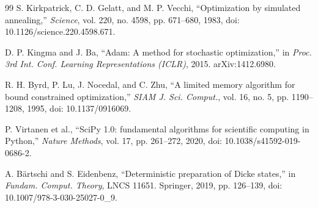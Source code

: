 \documentclass{ieeeaccess}
\begin{document}
\begin{thebibliography}{99}
 S. Kirkpatrick, C. D. Gelatt, and M. P. Vecchi, ``Optimization by simulated annealing,'' \textit{Science}, vol. 220, no. 4598, pp. 671--680, 1983, doi: 10.1126/science.220.4598.671.

 D. P. Kingma and J. Ba, ``Adam: A method for stochastic optimization,'' in \textit{Proc. 3rd Int. Conf. Learning Representations (ICLR)}, 2015. arXiv:1412.6980.

 R. H. Byrd, P. Lu, J. Nocedal, and C. Zhu, ``A limited memory algorithm for bound constrained optimization,'' \textit{SIAM J. Sci. Comput.}, vol. 16, no. 5, pp. 1190--1208, 1995, doi: 10.1137/0916069.

 P. Virtanen et al., ``SciPy 1.0: fundamental algorithms for scientific computing in Python,'' \textit{Nature Methods}, vol. 17, pp. 261--272, 2020, doi: 10.1038/s41592-019-0686-2.

 A. B\"{a}rtschi and S. Eidenbenz, ``Deterministic preparation of Dicke states,'' in \textit{Fundam. Comput. Theory}, LNCS 11651. Springer, 2019, pp. 126--139, doi: 10.1007/978-3-030-25027-0\_9.



\end{thebibliography}

\EOD
\end{document}

